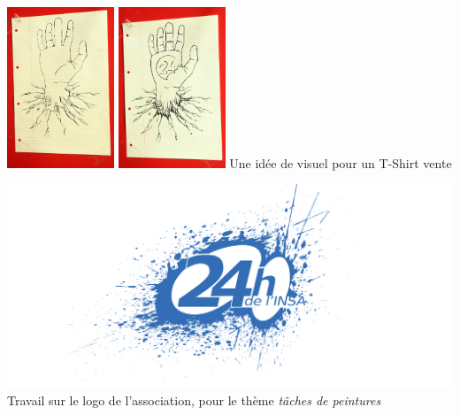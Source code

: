 \begin{center}
                \includegraphics[width=0.24\textwidth]{img/IMG_5792.JPG}
                \includegraphics[width=0.24\textwidth]{img/IMG_5848.JPG}
                Une idée de visuel pour un T-Shirt vente
            \end{center}
            
            \begin{center}                     
                \includegraphics[width=\textwidth]{img/splash24.png}
                Travail sur le logo de l'association, pour le thème \textit{tâches de peintures}
            \end{center}
                        
